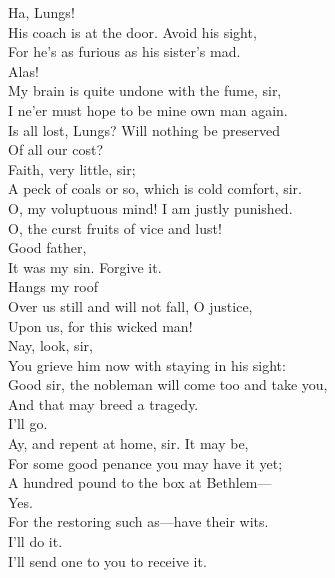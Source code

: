 \documentclass[a4paper,oneside,12pt]{memoir}
\begin{document}
\begin{drama*}
\mammonspeaks {} Ha, Lungs!\\
\facespeaks His coach is at the door. Avoid his sight,\\
For he's as furious as his sister's mad.\\
\mammonspeaks Alas!\\
\facespeaks {} My brain is quite undone with the fume, sir,\\
I ne'er must hope to be mine own man again.\\
\mammonspeaks Is all lost, Lungs? Will nothing be preserved\\
Of all our cost?\\
\facespeaks {} Faith, very little, sir;\\
A peck of coals or so, which is cold comfort, sir.\\
\mammonspeaks O, my voluptuous mind! I am justly punished.\\
\subtlespeaks O, the curst fruits of vice and lust!\\
\mammonspeaks {} Good father,\\
It was my sin. Forgive it.\\
\subtlespeaks {} Hangs my roof\\
Over us still and will not fall, O justice,\\
Upon us, for this wicked man!\\
\facespeaks {} Nay, look, sir,\\
You grieve him now with staying in his sight:\\
Good sir, the nobleman will come too and take you,\\
And that may breed a tragedy.\\
\mammonspeaks {} I'll go.\\
\facespeaks Ay, and repent at home, sir. It may be,\\
For some good penance you may have it yet;\\
A hundred pound to the box at Bethlem---\\
\mammonspeaks Yes.\\
\facespeaks {} For the restoring such as---have their wits.\\
\mammonspeaks I'll do it.\\
\facespeaks {} I'll send one to you to receive it.\\

\end{drama*}
\end{document}
